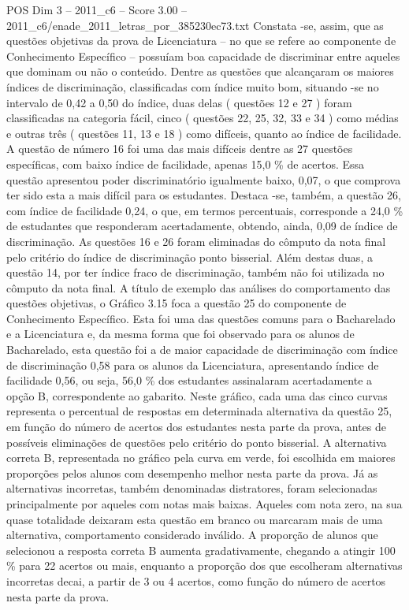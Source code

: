 \begin{textsample}{POS Dim 3 – 2011\_c6 – Score 3.00 – 2011\_c6/enade\_2011\_letras\_por\_385230ec73.txt}
Constata -se, assim, que as questões objetivas da prova de Licenciatura – no que se refere ao componente de Conhecimento Específico – possuíam boa capacidade de discriminar entre aqueles que dominam ou não o conteúdo.
Dentre as questões que alcançaram os maiores índices de discriminação, classificadas com índice muito bom, situando -se no intervalo de 0,42 a 0,50 do índice, duas delas ( questões 12 e 27 ) foram classificadas na categoria fácil, cinco ( questões 22, 25, 32, 33 e 34 ) como médias e outras três ( questões 11, 13 e 18 ) como difíceis, quanto ao índice de facilidade.
A questão de número 16 foi uma das mais difíceis dentre as 27 questões específicas, com baixo índice de facilidade, apenas 15,0 \% de acertos.
Essa questão apresentou poder discriminatório igualmente baixo, 0,07, o que comprova ter sido esta a mais difícil para os estudantes.
Destaca -se, também, a questão 26, com índice de facilidade 0,24, o que, em termos percentuais, corresponde a 24,0 \% de estudantes que responderam acertadamente, obtendo, ainda, 0,09 de índice de discriminação.
As questões 16 e 26 foram eliminadas do cômputo da nota final pelo critério do índice de discriminação ponto bisserial.
Além destas duas, a questão 14, por ter índice fraco de discriminação, também não foi utilizada no cômputo da nota final.
A título de exemplo das análises do comportamento das questões objetivas, o Gráfico 3.15 foca a questão 25 do componente de Conhecimento Específico.
Esta foi uma das questões comuns para o Bacharelado e a Licenciatura e, da mesma forma que foi observado para os alunos de Bacharelado, esta questão foi a de maior capacidade de discriminação com índice de discriminação 0,58 para os alunos da Licenciatura, apresentando índice de facilidade 0,56, ou seja, 56,0 \% dos estudantes assinalaram acertadamente a opção B, correspondente ao gabarito.
Neste gráfico, cada uma das cinco curvas representa o percentual de respostas em determinada alternativa da questão 25, em função do número de acertos dos estudantes nesta parte da prova, antes de possíveis eliminações de questões pelo critério do ponto bisserial.
A alternativa correta B, representada no gráfico pela curva em verde, foi escolhida em maiores proporções pelos alunos com desempenho melhor nesta parte da prova.
Já as alternativas incorretas, também denominadas distratores, foram selecionadas principalmente por aqueles com notas mais baixas.
Aqueles com nota zero, na sua quase totalidade deixaram esta questão em branco ou marcaram mais de uma alternativa, comportamento considerado inválido.
A proporção de alunos que selecionou a resposta correta B aumenta gradativamente, chegando a atingir 100 \% para 22 acertos ou mais, enquanto a proporção dos que escolheram alternativas incorretas decai, a partir de 3 ou 4 acertos, como função do número de acertos nesta parte da prova.

\end{textsample}
